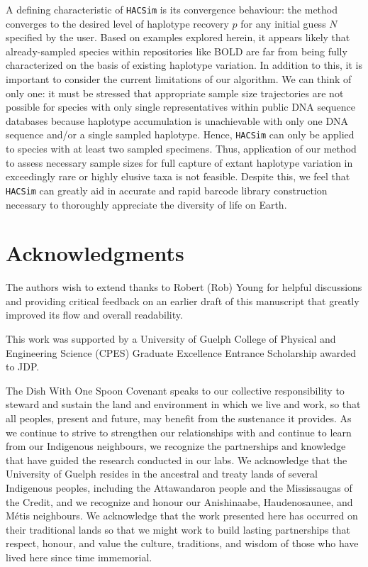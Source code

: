 A defining characteristic of {\tt HACSim} is its convergence behaviour: the method \\ converges to the desired level of haplotype recovery $p$ for any initial guess $N$ specified by the user. Based on examples explored herein, it appears likely that already-sampled species within repositories like BOLD are far from being fully characterized on the basis of existing haplotype variation. In addition to this, it is important to consider the current limitations of our algorithm. We can think of only one: it must be stressed that appropriate sample size trajectories are not possible for species with only single representatives within public DNA sequence databases because haplotype accumulation is unachievable with only one DNA sequence and/or a single sampled haplotype. Hence, {\tt HACSim} can only be applied to species with at least two sampled specimens. Thus, application of our method to assess necessary sample sizes for full capture of extant haplotype variation in exceedingly rare or highly elusive taxa is not feasible. Despite this, we feel that {\tt HACSim} can greatly aid in accurate and rapid barcode library construction necessary to thoroughly appreciate the diversity of life on Earth.


\newpage

\section*{Acknowledgments}

The authors wish to extend thanks to Robert (Rob) Young for helpful discussions and providing critical feedback on an earlier draft of this manuscript that greatly improved its flow and overall readability.

 

This work was supported by a University of Guelph College of Physical and \\ Engineering Science (CPES) Graduate Excellence Entrance Scholarship awarded to JDP.



The Dish With One Spoon Covenant speaks to our collective responsibility to steward and sustain the land and environment in which we live and work, so that all peoples, present and future, may benefit from the sustenance it provides. As we continue to strive to strengthen our relationships with and continue to learn from our Indigenous neighbours, we recognize the partnerships and knowledge that have guided the research conducted in our labs. We acknowledge that the University of Guelph resides in the ancestral and treaty lands of several Indigenous peoples, including the Attawandaron people and the Mississaugas of the Credit, and we recognize and honour our Anishinaabe, Haudenosaunee, and M{\'e}tis neighbours. We acknowledge that the work presented here has occurred on their traditional lands so that we might work to build lasting partnerships that respect, honour, and value the culture, traditions, and wisdom of those who have lived here since time immemorial.



